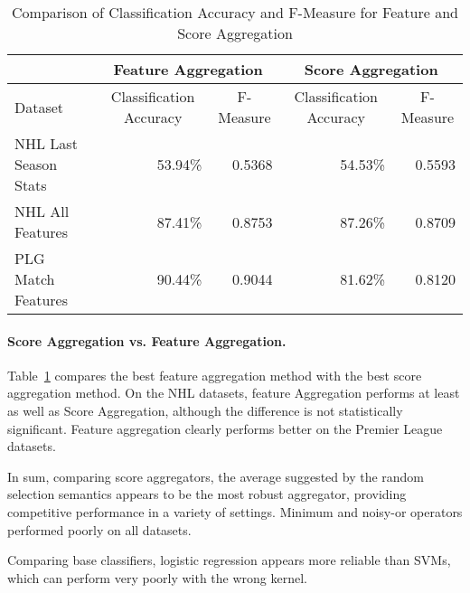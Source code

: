 \documentclass[oribibl]{llncs}%
\begin{document}
\begin{table}[htbp]
\caption{Comparison of Classification Accuracy and F-Measure for Feature and Score Aggregation}
\begin{tabular}{|l|r|r|r|r|}
\hline
 & \multicolumn{2}{c|}{Feature Aggregation} & \multicolumn{2}{c|}{Score Aggregation} \\ \hline
Dataset & \multicolumn{1}{c|}{Classification Accuracy} &\multicolumn{1}{c|}{F-Measure} & \multicolumn{1}{c|}{Classification Accuracy} &\multicolumn{1}{c|}{F-Measure}\\ \cline{ 1- 1}
NHL Last Season Stats & 53.94\% & 0.5368 & 54.53\% & 0.5593 \\ \hline
NHL All Features & 87.41\% & 0.8753 & 87.26\% & 0.8709 \\ \hline
PLG Match Features & 90.44\% & 0.9044 & 81.62\% & 0.8120 \\ \hline
\end{tabular}
\label{table:compare-all}
\end{table}


\paragraph{Score Aggregation vs. Feature Aggregation.} Table~\ref{table:compare-all} compares the best feature aggregation method with the best score aggregation method. On the NHL datasets, feature Aggregation performs at least as well as Score Aggregation, although the difference is not statistically significant. Feature aggregation  clearly performs better on the Premier League datasets. 

In sum, comparing score aggregators, the average suggested by the random selection semantics appears to be the most robust aggregator, providing competitive performance in a variety of settings. Minimum and noisy-or operators performed poorly on all datasets.



Comparing base classifiers, logistic regression appears more reliable than SVMs, which can perform very poorly with the wrong kernel. 
\end{document}
